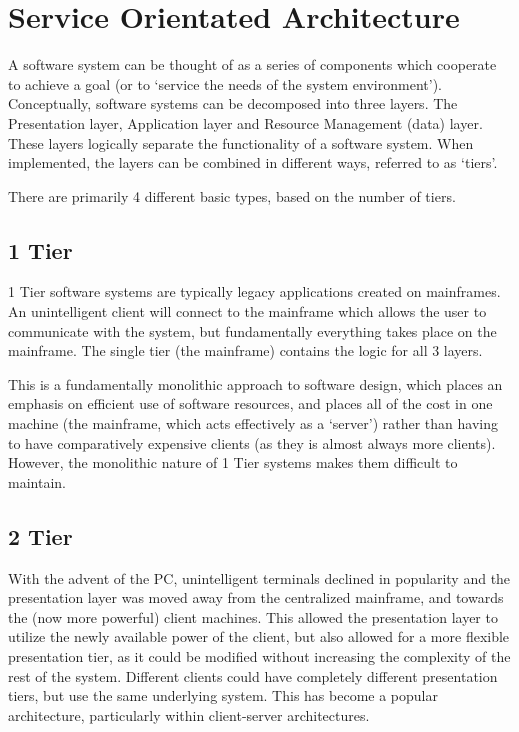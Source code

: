 \documentclass{article}
\begin{document}
\section{Service Orientated Architecture}
A software system can be thought of as a series of components which cooperate to achieve a goal (or to `service the needs of the system environment'). Conceptually, software systems can be decomposed into three layers. The Presentation layer, Application layer and Resource Management (data) layer. These layers logically separate the functionality of a software system. When implemented, the layers can be combined in different ways, referred to as `tiers'. 

There are primarily 4 different basic types, based on the number of tiers. 

\subsection{1 Tier}
1 Tier software systems are typically legacy applications created on mainframes. An unintelligent client will connect to the mainframe which allows the user to communicate with the system, but fundamentally everything takes place on the mainframe. The single tier (the mainframe) contains the logic for all 3 layers. 

This is a fundamentally monolithic approach to software design, which places an emphasis on efficient use of software resources, and places all of the cost in one machine (the mainframe, which acts effectively as a `server') rather than having to have comparatively expensive clients (as they is almost always more clients). However, the monolithic nature of 1 Tier systems makes them difficult to maintain.

\subsection{2 Tier}
With the advent of the PC, unintelligent terminals declined in popularity and the presentation layer was moved away from the centralized mainframe, and towards the (now more powerful) client machines. This allowed the presentation layer to utilize the newly available power of the client, but also allowed for a more flexible presentation tier, as it could be modified without increasing the complexity of the rest of the system. Different clients could have completely different presentation tiers, but use the same underlying system. This has become a popular architecture, particularly within client-server architectures. 
\end{document}
